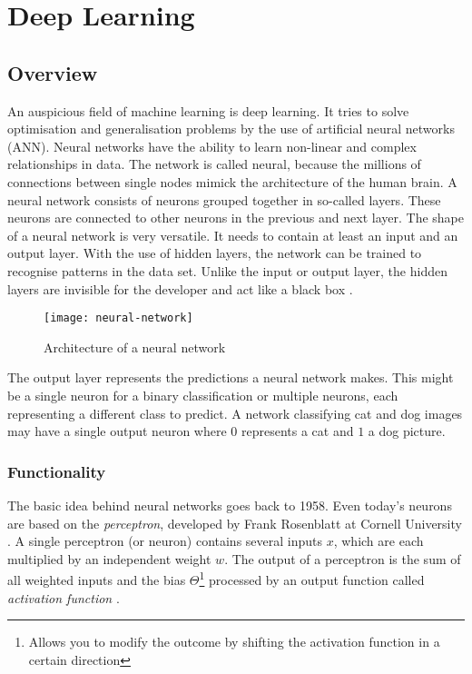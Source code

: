 \chapter{Deep Learning}

\section{Overview}

An auspicious field of machine learning is deep learning. It tries to solve optimisation and generalisation problems by the use of artificial neural networks (ANN). Neural networks have the ability to learn non-linear and complex relationships in data. The network is called neural, because the millions of connections between single nodes mimick the architecture of the human brain. A neural network consists of neurons grouped together in so-called layers. These neurons are connected to other neurons in the previous and next layer. The shape of a neural network is very versatile. It needs to contain at least an input and an output layer. With the use of hidden layers, the network can be trained to recognise patterns in the data set. Unlike the input or output layer, the hidden layers are invisible for the developer and act like a black box \cite{nn}.

\begin{figure}[!ht]
    \centering
    \texttt{[image: neural-network]}
    \caption{Architecture of a neural network}
    \label{fig:nn}
\end{figure}

The output layer represents the predictions a neural network makes. This might be a single neuron for a binary classification or multiple neurons, each representing a different class to predict. A network classifying cat and dog images may have a single output neuron where $0$ represents a cat and $1$ a dog picture.

\subsection{Functionality}

The basic idea behind neural networks goes back to 1958. Even today's neurons are based on the \emph{perceptron}, developed by Frank Rosenblatt at Cornell University \cite{wiki06}. A single perceptron (or neuron) contains several inputs $x$, which are each multiplied by an independent weight $w$. The output of a perceptron is the sum of all weighted inputs and the bias $\Theta$\footnote{Allows you to modify the outcome by shifting the activation function in a certain direction} processed by an output function called \emph{activation function} \cite{perc17}.


